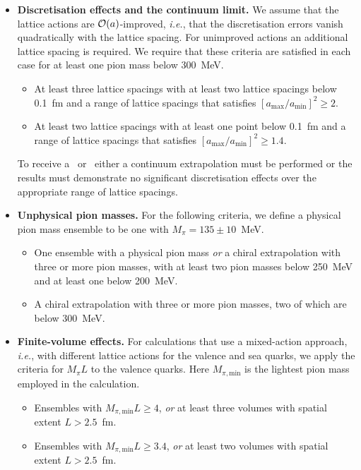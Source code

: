 \begin{itemize}
\item {\bfseries Discretisation effects and the continuum limit.} 
We assume that the lattice actions are ${\cal O}(a)$-improved, {\it i.e.}, 
that the discretisation errors vanish quadratically with the lattice spacing. 
%
For unimproved actions an additional lattice spacing is required. 
%
We require that these criteria are satisfied in each case for at least one 
pion mass below 300~MeV.
%
\begin{itemize}
%
\item[\bstar] At least three lattice spacings with at least two lattice 
spacings below 0.1~fm and a range of lattice spacings that satisfies 
$[a_{\mathrm{max}}/a_{\mathrm{min}}]^2 \geq 2$.
%
\item[\bcirc] At least two lattice spacings with at least one point below 
0.1~fm and a range of lattice spacings that satisfies 
$[a_{\mathrm{max}}/a_{\mathrm{min}}]^2 \geq 1.4$.
%
\end{itemize}
%
To receive a \bstar~or \bcirc~either a continuum extrapolation must be 
performed or the results must demonstrate no significant discretisation 
effects over the appropriate range of lattice spacings.

\item {\bfseries Unphysical pion masses.} 
For the following criteria, we define a physical pion mass ensemble 
to be one with $M_\pi=135\pm 10$~MeV.
%
\begin{itemize}
\item[\bstar] One ensemble with a physical pion mass \emph{or} a chiral 
extrapolation with three or more pion masses, with at least two pion masses 
below 250~MeV and at least one below 200~MeV.
%
\item[\bcirc] A chiral extrapolation with three or more pion masses, two of 
which are below 300~MeV.
%
\end{itemize}

\item {\bfseries Finite-volume effects.} 
%
For calculations that use a mixed-action approach, {\it i.e.},
with different lattice actions for the valence and sea quarks, 
we apply the criteria for $M_\pi L$ to the valence quarks. Here $M_{\pi,\mathrm{min}}$
is the lightest pion mass employed in the calculation.
%
\begin{itemize}
%
\item[\bstar] Ensembles with $M_{\pi,\mathrm{min}}L\geq 4$, \emph{or} at least 
three volumes with spatial extent $L>2.5$~fm.
\item[\bcirc] Ensembles with $M_{\pi,\mathrm{min}}L \geq 3.4$, \emph{or} at least 
two volumes with spatial extent $L>2.5$~fm.
\end{itemize}


\end{itemize}
